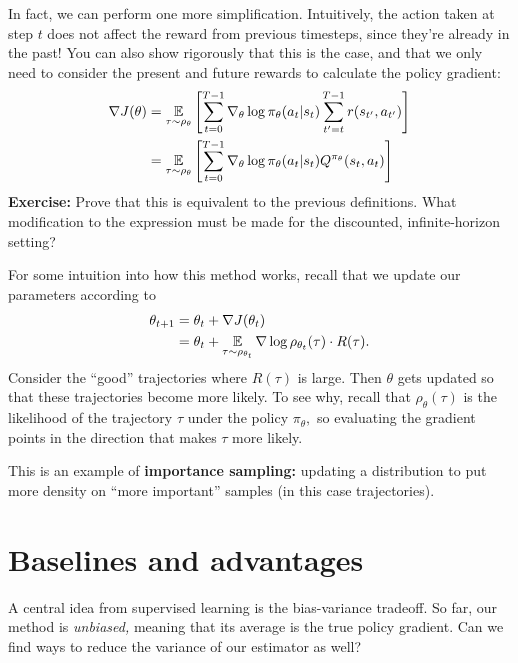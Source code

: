 \documentclass[\main/main]{subfiles}
\begin{document}
In fact, we can perform one more simplification. Intuitively, the action taken at step $t$ does not affect the reward from previous timesteps, since they're already in the past! You can also show rigorously that this is the case, and that we only need to consider the present and future rewards to calculate the policy gradient: \begin{equation}
    \begin{split}
        \nabla J(\theta) &= \operatorname*{\mathbb{E}}_{\tau \sim \rho_\theta} \left[ \sum_{t=0}^{T-1} \nabla_\theta \log \pi_{\theta}(a_t | s_t) \sum_{t' = t}^{T-1} r(s_{t'}, a_{t'}) \right] \\
        &= \operatorname*{\mathbb{E}}_{\tau \sim \rho_\theta} \left[ \sum_{t=0}^{T-1} \nabla_\theta \log \pi_{\theta}(a_t | s_t) Q^{\pi_\theta}(s_{t}, a_{t}) \right]
    \end{split}
    \label{eq:pg_with_q}
\end{equation}
\textbf{Exercise:} Prove that this is equivalent to the previous definitions. What modification to the expression must be made for the discounted, infinite-horizon setting?

For some intuition into how this method works, recall that we update our parameters according to \[
    \begin{split}
        \theta_{t+1} &= \theta_t + \nabla J(\theta_t) \\
        &= \theta_t + \operatorname*{\mathbb{E}}_{\tau \sim \rho_{\theta_t}} \nabla \log \rho_{\theta_t}(\tau) \cdot R(\tau).
    \end{split}
\]
Consider the ``good'' trajectories where $R(\tau)$ is large. Then $\theta$ gets updated so that these trajectories become more likely. To see why, recall that $\rho_{\theta}(\tau)$ is the likelihood of the trajectory $\tau$ under the policy $\pi_\theta,$ so evaluating the gradient points in the direction that makes $\tau$ more likely.

This is an example of \textbf{importance sampling:} updating a distribution to put more density on ``more important'' samples (in this case trajectories).

\section{Baselines and advantages}


A central idea from supervised learning is the bias-variance tradeoff. So far, our method is \emph{unbiased,} meaning that its average is the true policy gradient. Can we find ways to reduce the variance of our estimator as well?
\end{document}
